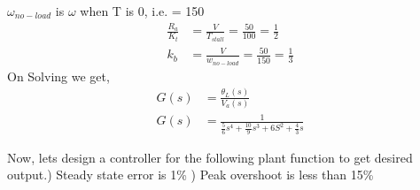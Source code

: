 \begin{enumerate}[label=\thesection.\arabic*.,ref=\thesection.\theenumi]
$\omega_{no-load}$ is $\omega$ when T is 0, i.e. = 150\newline
\begin{align}
    \frac{R_a}{K_t} &= \frac{V}{T_{stall}} = \frac{50}{100} = \frac{1}{2}\\
    k_b &= \frac{V}{w_{no-load}} = \frac{50}{150} = \frac{1}{3}
\end{align}
On Solving we get,\newline
\begin{align}
G(s) &= \frac{\theta_L(s)}{V_a(s)}\\
G(s) &= \frac{1}{\frac{5}{6}s^4 + \frac{10}{9}s^3 + 6S^2 + \frac{4}{3}s}
\end{align}


Now, lets design a controller for the following plant function to get desired output.) Steady state error is 1\% ) Peak overshoot is less than 15\% \newline


\end{enumerate}
